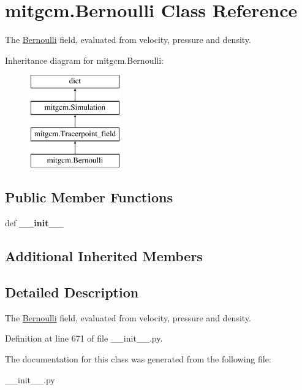 \hypertarget{classmitgcm_1_1Bernoulli}{\section{mitgcm.\+Bernoulli Class Reference}
\label{classmitgcm_1_1Bernoulli}
}


The \hyperlink{classmitgcm_1_1Bernoulli}{Bernoulli} field, evaluated from velocity, pressure and density.  


Inheritance diagram for mitgcm.\+Bernoulli\+:\begin{figure}[H]
\begin{center}
\leavevmode
\includegraphics[height=4.000000cm]{classmitgcm_1_1Bernoulli}
\end{center}
\end{figure}
\subsection*{Public Member Functions}
\begin{DoxyCompactItemize}
\item 
\hypertarget{classmitgcm_1_1Bernoulli_a5f78ab27df77454ef131f5c24ca8dbf9}{def {\bfseries \+\_\+\+\_\+init\+\_\+\+\_\+}}\label{classmitgcm_1_1Bernoulli_a5f78ab27df77454ef131f5c24ca8dbf9}

\end{DoxyCompactItemize}
\subsection*{Additional Inherited Members}


\subsection{Detailed Description}
The \hyperlink{classmitgcm_1_1Bernoulli}{Bernoulli} field, evaluated from velocity, pressure and density. 



Definition at line 671 of file \+\_\+\+\_\+init\+\_\+\+\_\+.\+py.



The documentation for this class was generated from the following file\+:\begin{DoxyCompactItemize}
\item 
\+\_\+\+\_\+init\+\_\+\+\_\+.\+py\end{DoxyCompactItemize}
